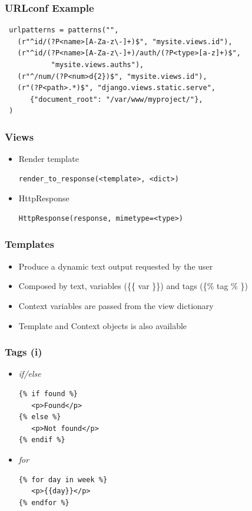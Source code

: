 \begin{frame}[fragile]
\frametitle{URLconf Example}
{\scriptsize
\begin{verbatim}
 urlpatterns = patterns("",
   (r"^id/(?P<name>[A-Za-z\-]+)$", "mysite.views.id"),
   (r"^id/(?P<name>[A-Za-z\-]+)/auth/(?P<type>[a-z]+)$",
           "mysite.views.auths"),
   (r"^/num/(?P<num>d{2})$", "mysite.views.id"),
   (r"(?P<path>.*)$", "django.views.static.serve", 
      {"document_root": "/var/www/myproject/"},
 )
\end{verbatim}
}
\end{frame}




\begin{frame}[fragile]
\frametitle{Views}
\begin{itemize}
\item Render template
{\scriptsize
\begin{verbatim}
render_to_response(<template>, <dict>)
\end{verbatim}
}
\item HttpResponse
{\scriptsize
\begin{verbatim}
HttpResponse(response, mimetype=<type>)
\end{verbatim}
}
\end{itemize}
\end{frame}

\begin{frame}[fragile]
\frametitle{Templates}
\begin{itemize}
\item Produce a dynamic text output requested by the user
\item Composed by text, variables (\{\{ var \}\}) and tags (\{\% tag \% \})
\item Context variables are passed from the view dictionary
\item Template and Context objects is also available
\end{itemize}
\end{frame}


\begin{frame}[fragile]
\frametitle{Tags (i)}
\begin{itemize}
\item \textit{if/else}
{\scriptsize
\begin{verbatim}
{% if found %}
   <p>Found</p>
{% else %}
   <p>Not found</p>
{% endif %}
\end{verbatim}
}
\item \textit{for}
{\scriptsize
\begin{verbatim}
{% for day in week %}
   <p>{{day}}</p>
{% endfor %}
\end{verbatim}
}
\end{itemize}
\end{frame}


